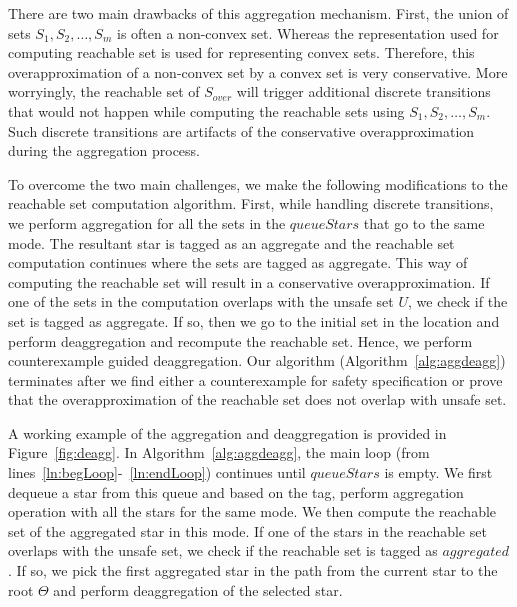 There are two main drawbacks of this aggregation mechanism. 
%
First, the union of sets $S_1, S_2, \ldots, S_m$ is often a non-convex set. 
%
Whereas the representation used for computing reachable set is used for representing convex sets. 
%
Therefore, this overapproximation of a non-convex set by a convex set is very conservative.
%
More worryingly, the reachable set of $S_{over}$ will trigger additional discrete transitions that would not happen while computing the reachable sets using $S_1, S_2, \ldots, S_m$.
%
Such discrete transitions are artifacts of the conservative overapproximation during the aggregation process.



To overcome the two main challenges, we make the following modifications to the reachable set computation algorithm.
First, while handling discrete transitions, we perform aggregation for all the sets in the $queueStars$ that go to the same mode. 
%
The resultant star is tagged as an \textsf{aggregate} and the reachable set computation continues where the sets are tagged as \textsf{aggregate}. 
%
This way of computing the reachable set will result in a conservative overapproximation.
%
If one of the sets in the computation overlaps with the unsafe set $U$, we check if the set is tagged as \textsf{aggregate}.
%
If so, then we go to the initial set in the location and perform deaggregation and recompute the reachable set.
%
Hence, we perform counterexample guided deaggregation.
%
Our algorithm (Algorithm~\ref{alg:aggdeagg}) terminates after we find either a counterexample for safety specification or prove that the overapproximation of the reachable set does not overlap with unsafe set. 
%



%
A working example of the aggregation and deaggregation is provided in Figure~\ref{fig:deagg}.
%
In Algorithm~\ref{alg:aggdeagg}, the main loop (from lines~\ref{ln:begLoop}-~\ref{ln:endLoop}) continues until $queueStars$ is empty. 
%
We first dequeue a star from this queue and based on the tag, perform aggregation operation with all the stars for the same mode. 
%
We then compute the reachable set of the aggregated star in this mode. If one of the stars in the reachable set overlaps with the unsafe set, we check if the reachable set is tagged as $aggregated$. 
%
If so, we pick the first aggregated star in the path from the current star to the root $\Theta$ and perform deaggregation of the selected star.

